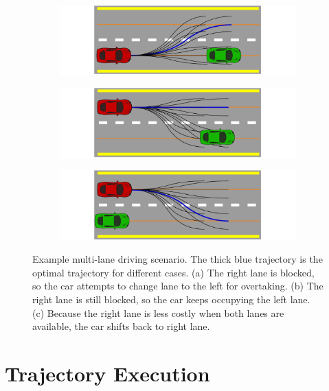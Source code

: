 \begin{figure}[h]
  \centering
  \begin{subfigure}[b]{1.0\linewidth}
      \includegraphics[width=\linewidth]{figures/frenet-shift-left-lane.pdf}
    \caption{}
  \end{subfigure}
  \begin{subfigure}[b]{1.0\linewidth}
      \includegraphics[width=\linewidth]{figures/frenet-keep-left-lane.pdf}
    \caption{}
  \end{subfigure}
  \begin{subfigure}[b]{1.0\linewidth}
      \includegraphics[width=\linewidth]{figures/frenet-shift-right-lane.pdf}
    \caption{}
  \end{subfigure}
  \caption{Example multi-lane driving scenario. The thick blue trajectory is
      the optimal trajectory for different cases. (a) The right lane is
      blocked, so the car attempts to change lane to the left for overtaking.
      (b) The right lane is still blocked, so the car keeps occupying the left
  lane. (c) Because the right lane is less costly when both lanes are
  available, the car shifts back to right lane.}
  \label{figure:frenet-lanes}
\end{figure}

\section{Trajectory Execution}

